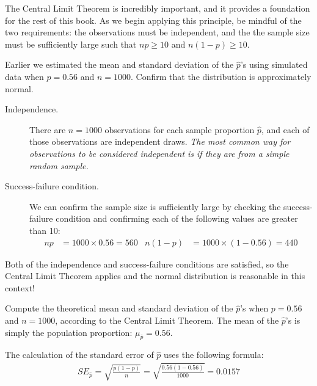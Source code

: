 The Central Limit Theorem is incredibly important, and it provides
a foundation for the rest of this book. As we begin applying
this principle, be mindful of the two requirements:
the observations must be independent, and the the sample size must
be sufficiently large such that $np \geq 10$ and $n(1-p) \geq 10$.

\begin{example}{Earlier we estimated the mean and standard
deviation of the $\hat{p}$'s using simulated data when $p = 0.56$
and $n = 1000$. Confirm that the distribution is approximately
normal.}\label{sample_p56_n1000_confirm_normal}
\begin{description}
\item[Independence.] There are $n = 1000$ observations for each
    sample proportion $\hat{p}$, and each of those observations
    are independent draws. \emph{The most common way for
    observations to be considered independent is if they are from
    a simple random sample.}
\item[Success-failure condition.] We can confirm the sample size
    is sufficiently large by checking the success-failure condition
    and confirming each of the following values are greater than 10:
    \begin{align*}
    np &= 1000 \times 0.56 = 560
    &n(1-p) &= 1000 \times (1 - 0.56) = 440
    \end{align*}
\end{description}
Both of the independence and success-failure conditions are
satisfied, so the Central Limit Theorem applies and the normal
distribution is reasonable in this context!
\end{example}

\begin{example}{Compute the theoretical mean and standard deviation
of the $\hat{p}$'s when $p = 0.56$ and $n = 1000$, according to the
Central Limit Theorem.}\label{sample_p56_n1000_mean_se}
The mean of the $\hat{p}$'s is simply the population proportion:
$\mu_{\hat{p}} = 0.56$.

The calculation of the standard error of $\hat{p}$ uses
the following formula:
\begin{align*}
SE_{\hat{p}}
    = \sqrt{\frac{p (1 - p)}{n}}
    = \sqrt{\frac{0.56 (1 - 0.56)}{1000}}
    = 0.0157
\end{align*}
\end{example}

